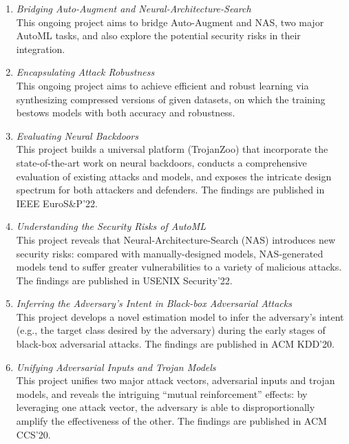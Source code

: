 \documentclass{resume}
\begin{document}
\begin{resume}
\begin{enumerate}[labelsep=18pt, parsep=8pt]

\item {\em Bridging Auto-Augment and Neural-Architecture-Search}\\
This ongoing project aims to bridge Auto-Augment and NAS, two major AutoML tasks, and also explore the potential security risks in their integration.

\item {\em Encapsulating Attack Robustness}\\
This ongoing project aims to achieve efficient and robust learning via synthesizing compressed versions of given datasets, on which the training bestows models with both accuracy and robustness.  

\item {\em Evaluating Neural Backdoors}\\
This project builds a universal platform (TrojanZoo) that incorporate the state-of-the-art work on neural backdoors, conducts a comprehensive evaluation of existing attacks and models, and exposes the intricate design spectrum for both attackers and defenders. The findings are published in IEEE EuroS\&P'22.

\item {\em Understanding the Security Risks of AutoML}\\
This project reveals that Neural-Architecture-Search (NAS) introduces new security risks: compared with manually-designed models, NAS-generated models tend to suffer greater vulnerabilities to a variety of malicious attacks. The findings are published in USENIX Security'22. 

\item {\em Inferring the Adversary's Intent in Black-box Adversarial Attacks}\\
This project develops a novel estimation model to infer the adversary's intent (e.g., the target class desired by the adversary) during the early stages of black-box adversarial attacks. The findings are published in ACM KDD'20. 

\item {\em Unifying Adversarial Inputs and Trojan Models}\\
This project unifies two major attack vectors, adversarial inputs and trojan models, and reveals the intriguing ``mutual reinforcement'' effects: by leveraging one attack vector, the adversary is able to disproportionally amplify the effectiveness of the other. The findings are published in ACM CCS'20. 


\end{enumerate}
\end{resume}
\end{document}
